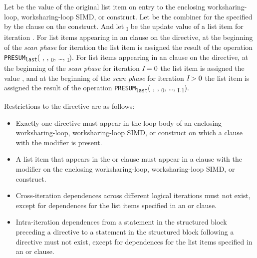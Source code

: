 Let  be the value of the original list item on entry to the
enclosing worksharing-loop, worksharing-loop SIMD, or  construct. 
Let  be the combiner for the  specified 
by the  clause on the construct. And let \textsubscript{I} 
be the update value of a list item for iteration .  For list items 
appearing in an  clause on the  directive, at the 
beginning of the \textit{scan phase} for iteration  the list item is assigned
the result of the operation \texttt{PRESUM\textsubscript{last}}( , 
, \textsubscript{0}, \ldots, \textsubscript{I}).  
For list items appearing in an  clause on the  
directive, at the beginning of the \textit{scan phase} for iteration $\plc{I} = 0$
the list item is assigned the value , and at the beginning of 
the \textit{scan phase} for iteration $\plc{I} > 0$  the list item is assigned the
result of the operation \texttt{PRESUM\textsubscript{last}}( , 
, \textsubscript{0}, \ldots, \textsubscript{I-1}).


\restrictions
Restrictions to the  directive are as follows:

\begin{itemize}
\item Exactly one  directive must appear in the loop body of an
      enclosing worksharing-loop, worksharing-loop SIMD, or  
      construct on which a  clause with the  
      modifier is present.
\item A list item that appears in the  or 
      clause must appear in a  clause with the 
      modifier on the enclosing worksharing-loop, worksharing-loop SIMD, or 
       construct.
\item Cross-iteration dependences across different logical iterations must not
      exist, except for dependences for the list items specified in an
       or  clause.
\item Intra-iteration dependences from a statement in the structured block
      preceding a  directive to a statement in the structured block
      following a  directive must not exist, except for dependences
      for the list items specified in an  or 
      clause.
\end{itemize}

